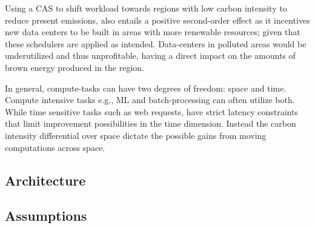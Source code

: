 


Using a CAS to shift workload towards regions with low carbon intensity to reduce present emissions, also entails a positive second-order effect as it incentives new data centers to be built in areas with more renewable resources; given that these schedulers are applied as intended. Data-centers in polluted areas would be underutilized and thus unprofitable, having a direct impact on the amounts of brown energy produced in the region.    

 


In general, compute-tasks can have two degrees of freedom: space and time. Compute intensive tasks e.g., ML and batch-processing can often utilize both. While time sensitive tasks such as web requests, have strict latency constraints that limit improvement possibilities in the time dimension. Instead the carbon intensity differential over space dictate the possible gains from moving computations across space.

\subsection{Architecture}




\subsection{Assumptions}


